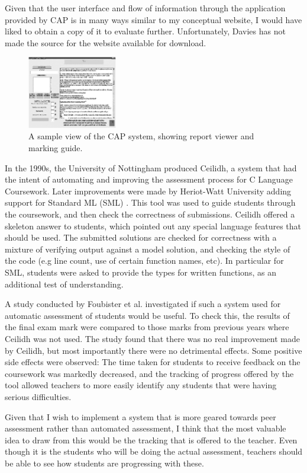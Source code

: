 \documentclass[a4paper,11pt]{report}
\begin{document}
Given that the user interface and flow of information through the application provided by CAP is in many ways similar to my conceptual website, I would have liked to obtain a copy of it to evaluate further. Unfortunately, Davies has not made the source for the website available for download.\par
\begin{figure}
\centering
\includegraphics[width=0.35\textwidth]{CAP.png}
\caption{\footnotesize A sample view of the CAP system, showing report viewer and marking guide.}
\end{figure}


In the 1990s, the University of Nottingham produced Ceilidh, a system that had the intent of automating and improving the assessment process for C Language Coursework. Later improvements were made by Heriot-Watt University adding support for
Standard ML (SML) \cite{foubister_automatic_1997}. This tool was used to guide students through the coursework, and then check the correctness of submissions. Ceilidh offered a skeleton answer to students, which pointed out any special language features that should be used. The submitted solutions are checked for correctness with a mixture of verifying output against a model solution, and checking the style of the code (e.g line count, use of certain function names, etc).  In particular for SML, students were asked to provide the types for written functions, as an additional test of understanding.\par
A study conducted by Foubister et al. investigated if such a system used for automatic assessment of students would be useful. To check this, the results of the final exam mark were compared to those marks from previous years where Ceilidh was not used. The study found that there was no real improvement made by Ceilidh, but most importantly there were no detrimental effects. Some positive side effects were observed: The time taken for students to receive feedback on the coursework was markedly decreased, and the tracking of progress offered by the tool allowed teachers to more easily identify any students that were having serious difficulties.\par
Given that I wish to implement a system that is more geared towards peer assessment rather than automated assessment, I think that the most valuable idea to draw from this would be the tracking that is offered to the teacher. Even though it is the students who will be doing the actual assessment, teachers should be able to see how students are progressing with these.\par
\end{document}
